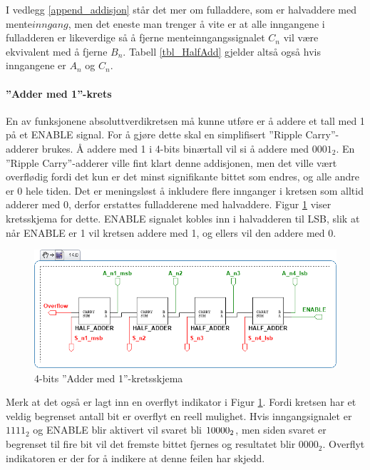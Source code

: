 \documentclass[11pt, a4paper, norwegian]{article}
\begin{document}
I vedlegg \ref{append_addisjon} står det mer om fulladdere, som er halvaddere med mente$inngang$, men det eneste man trenger å vite er at alle inngangene i fulladderen er likeverdige så å fjerne menteinngangssignalet $C_n$ vil være ekvivalent med å fjerne $B_n$. Tabell \ref{tbl_HalfAdd} gjelder altså også hvis inngangene er $A_n$ og $C_n$. 

\paragraph{''Adder med 1''-krets}
En av funksjonene absoluttverdikretsen må kunne utføre er å addere et tall med 1 på et ENABLE signal. For å gjøre dette skal en simplifisert ''Ripple Carry''-adderer brukes. Å addere med 1 i 4-bits binærtall vil si å addere med $0001_2$. En ''Ripple Carry''-adderer ville fint klart denne addisjonen, men det ville vært overflødig fordi det kun er det minst signifikante bittet som endres, og alle andre er 0 hele tiden. Det er meningsløst å inkludere flere innganger i kretsen som alltid adderer med 0, derfor erstattes fulladderene med halvaddere. Figur \ref{fig_riplPluss1} viser kretsskjema for dette. ENABLE signalet kobles inn i halvadderen til LSB, slik at når ENABLE er 1 vil kretsen addere med 1, og ellers vil den addere med 0. 

\begin{figure}[h]
  \caption{4-bits ''Adder med 1''-kretsskjema}
  \label{fig_riplPluss1}
  \centerline{\includegraphics[width=500pt]{4bit_pluss1.png}}
\end{figure}

Merk at det også er lagt inn en overflyt indikator i Figur \ref{fig_riplPluss1}. Fordi kretsen har et veldig begrenset antall bit er overflyt en reell mulighet. Hvis inngangsignalet er $1111_2$ og ENABLE blir aktivert vil svaret bli $1 \space 0000_2$, men siden svaret er begrenset til fire bit vil det fremste bittet fjernes og resultatet blir $0000_2$. Overflyt indikatoren er der for å indikere at denne feilen har skjedd. 
\end{document}
